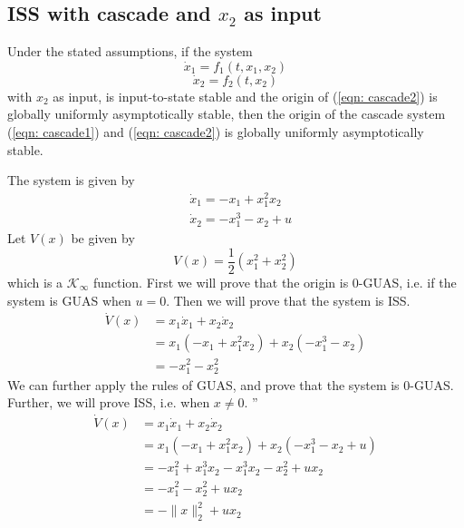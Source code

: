\documentclass{article}
\begin{document}
\subsection{ISS with cascade and $x_2$ as input}
Under the stated assumptions, if the system
\begin{equation}
	\dot{x}_1=f_1(t, x_1, x_2)
	\label{eqn: cascade1}
\end{equation}
\begin{equation}
	\dot{x}_2=f_2(t, x_2)
	\label{eqn: cascade2}
\end{equation}
with $x_2$ as input, is input-to-state stable and the origin of (\ref{eqn: cascade2}) is globally uniformly asymptotically stable, then the origin of the cascade system (\ref{eqn: cascade1}) and (\ref{eqn: cascade2}) is globally uniformly asymptotically stable.
\begin{frm-ex}
The system is given by
$$
	\begin{aligned}
		 & \dot{x}_1=-x_1+x_1^2 x_2 \\
		 & \dot{x}_2=-x_1^3-x_2+u
	\end{aligned}
$$
Let $V(x)$ be given by
$$
	V(x)=\frac{1}{2}\left(x_1^2+x_2^2\right)
$$
which is a $\mathcal{K}_{\infty}$ function. First we will prove that the origin is 0-GUAS, i.e. if the system is GUAS when $u=0$. Then we will prove that the system is ISS.
\begin{equation*}
	\begin{split}
		\dot V(x) & = x_1 \dot x_1 + x_2 \dot x_2                  \\
		          & = x_1 (-x_1 + x_1^{2}x_2) + x_2 (-x_1^{3}-x_2) \\
		          & = -x_1^{2} - x_2^{2}
	\end{split}
\end{equation*}
We can further apply the rules of GUAS, and prove that the system is 0-GUAS. Further, we will prove ISS, i.e. when $x \neq 0$. ''
$$
	\begin{aligned}
		\dot{V}(x) & =x_1 \dot{x}_1+x_2 \dot{x}_2                                 \\
		           & =x_1\left(-x_1+x_1^2 x_2\right)+x_2\left(-x_1^3-x_2+u\right) \\
		           & =-x_1^2+x_1^3 x_2-x_1^3 x_2-x_2^2+u x_2                      \\
		           & =-x_1^2-x_2^2+u x_2                                          \\
		           & =-\|x\|_2^2+u x_2
	\end{aligned}
$$
\end{frm-ex}
\end{document}
